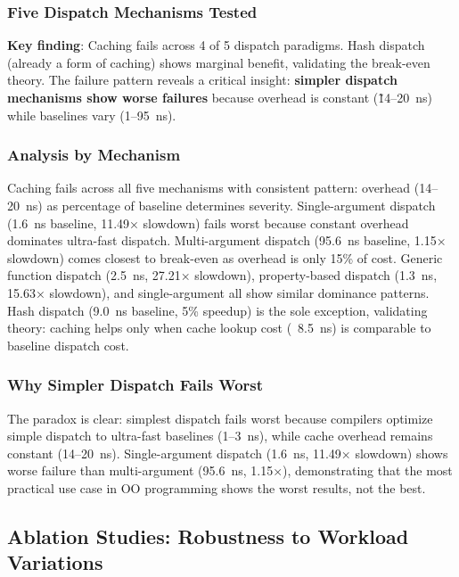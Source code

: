 \documentclass[sigplan,final,acmsmall,review,screen]{acmart}
\begin{document}
\subsubsection{Five Dispatch Mechanisms Tested}

\textbf{Key finding}: Caching fails across 4 of 5 dispatch paradigms. Hash dispatch (already a form
of caching) shows marginal benefit, validating the break-even theory. The failure pattern reveals a
critical insight: \textbf{simpler dispatch mechanisms show worse failures} because overhead is
constant (\~14--20~ns) while baselines vary (1--95~ns).

\subsubsection{Analysis by Mechanism}

Caching fails across all five mechanisms with consistent pattern: overhead (14--20~ns) as percentage
of baseline determines severity. Single-argument dispatch (1.6~ns baseline, 11.49× slowdown) fails worst
because constant overhead dominates ultra-fast dispatch. Multi-argument dispatch (95.6~ns baseline, 1.15× slowdown)
comes closest to break-even as overhead is only 15\% of cost. Generic function dispatch (2.5~ns, 27.21× slowdown),
property-based dispatch (1.3~ns, 15.63× slowdown), and single-argument all show similar dominance patterns.
Hash dispatch (9.0~ns baseline, 5\% speedup) is the sole exception, validating theory: caching helps only when
cache lookup cost (~8.5~ns) is comparable to baseline dispatch cost.

\subsubsection{Why Simpler Dispatch Fails Worst}

The paradox is clear: simplest dispatch fails worst because compilers optimize simple dispatch to ultra-fast baselines
(1--3~ns), while cache overhead remains constant (14--20~ns). Single-argument dispatch (1.6~ns, 11.49× slowdown) shows
worse failure than multi-argument (95.6~ns, 1.15×), demonstrating that the most practical use case in OO programming
shows the worst results, not the best.

\subsection{Ablation Studies: Robustness to Workload Variations}
\label{sec:ablations}
\end{document}
